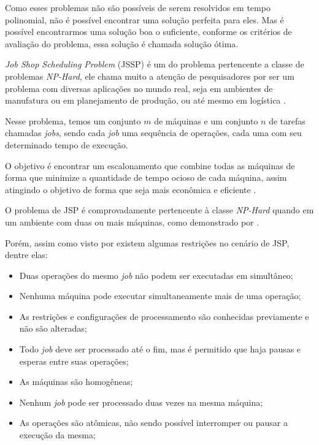     Como esses problemas não são possíveis de serem resolvidos em tempo polinomial, não é possível encontrar uma solução perfeita para eles. Mas é possível encontrarmos uma solução boa o suficiente, conforme os critérios de avaliação do problema, essa solução é chamada solução ótima.\newline

    \textit{Job Shop Scheduling Problem} (JSSP) é um do problema pertencente a classe de problemas \textit{NP-Hard}, ele chama muito a atenção de pesquisadores por ser um problema com diversas aplicações no mundo real, seja em ambientes de manufatura ou em planejamento de produção, ou até mesmo em logística \cite{Cheng1996}.\newline

    Nesse problema, temos um conjunto $m$ de máquinas e um conjunto $n$ de tarefas chamadas \textit{jobs}, sendo cada \textit{job} uma sequência de operações, cada uma com seu determinado tempo de execução. \newline 

    O objetivo é encontrar um escalonamento que combine todas as máquinas de forma que minimize a quantidade de tempo ocioso de cada máquina, assim atingindo o objetivo de forma que seja mais econômica e eficiente \cite{Cheng1996}. \newline

    O problema de JSP é comprovadamente pertencente à classe \textit{NP-Hard} quando em um ambiente com duas ou mais máquinas, como demonstrado por \cite{Lenstra1979}. \newline

    Porém, assim como visto por \cite{Bagchi1999} existem algumas restrições no cenário de JSP, dentre elas:
    \begin{itemize}
        \item Duas operações do mesmo \textit{job} não podem ser executadas em simultâneo;
        \item Nenhuma máquina pode executar simultaneamente mais de uma operação;
        \item As restrições e configurações de processamento são conhecidas previamente e não são alteradas;
        \item Todo \textit{job} deve ser processado até o fim, mas é permitido que haja pausas e esperas entre suas operações;
        \item As máquinas são homogêneas;
        \item Nenhum \textit{job} pode ser processado duas vezes na mesma máquina;
        \item As operações são atômicas, não sendo possível interromper ou pausar a execução da mesma;
    \end{itemize}

